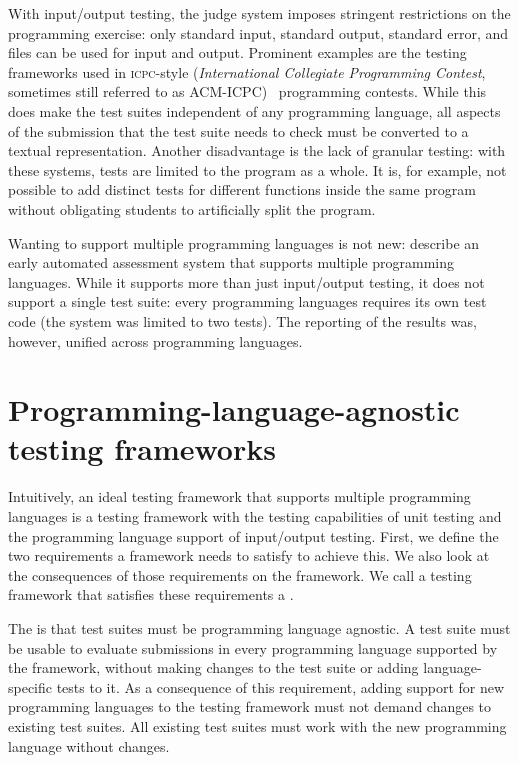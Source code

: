 \documentclass[../main]{subfiles}
\begin{document}
With input/output testing, the judge system imposes stringent restrictions on the programming exercise: only standard input, standard output, standard error, and files can be used for input and output.
Prominent examples are the testing frameworks used in \textsc{icpc}-style (\emph{International Collegiate Programming Contest}, sometimes still referred to as ACM-ICPC)~\autocite{ICPCFactSheet2023} programming contests.
While this does make the test suites independent of any programming language, all aspects of the submission that the test suite needs to check must be converted to a textual representation.
Another disadvantage is the lack of granular testing: with these systems, tests are limited to the program as a whole.
It is, for example, not possible to add distinct tests for different functions inside the same program without obligating students to artificially split the program.

Wanting to support multiple programming languages is not new: \textcite{hextAutomaticGradingScheme1969} describe an early automated assessment system that supports multiple programming languages.
While it supports more than just input/output testing, it does not support a single test suite: every programming languages requires its own test code (the system was limited to two tests).
The reporting of the results was, however, unified across programming languages.

\section{Programming-language-agnostic testing frameworks}\label{sec:tested1-programming-language-agnostic-test-frameworks}

Intuitively, an ideal testing framework that supports multiple programming languages is a testing framework with the testing capabilities of unit testing and the programming language support of input/output testing.
First, we define the two requirements a framework needs to satisfy to achieve this.
We also look at the consequences of those requirements on the framework.
We call a testing framework that satisfies these requirements a .

The  is that test suites must be programming language agnostic.
A test suite must be usable to evaluate submissions in every programming language supported by the framework, without making changes to the test suite or adding language-specific tests to it.
As a consequence of this requirement, adding support for new programming languages to the testing framework must not demand changes to existing test suites.
All existing test suites must work with the new programming language without changes.
\end{document}
